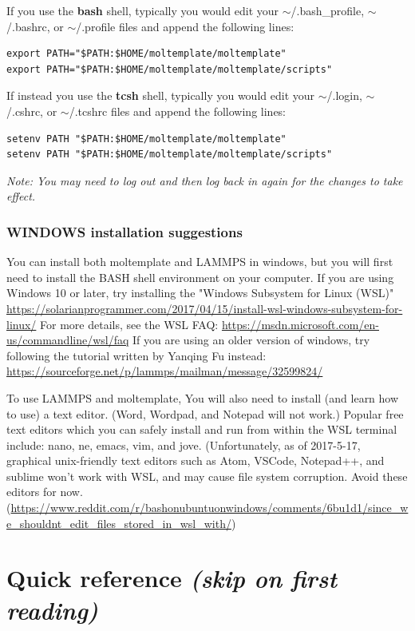 \documentclass[11pt]{article}
\begin{document}
If you use the \textbf{bash} shell, typically you would edit your 
\mbox{$\sim$/.bash\_profile}, 
\mbox{$\sim$/.bashrc}, or 
\mbox{$\sim$/.profile} files
and append the following lines:
\begin{verbatim}
export PATH="$PATH:$HOME/moltemplate/moltemplate"
export PATH="$PATH:$HOME/moltemplate/moltemplate/scripts"
\end{verbatim}
If instead you use the \textbf{tcsh} shell, typically you would edit your 
\mbox{$\sim$/.login}, 
\mbox{$\sim$/.cshrc}, or 
\mbox{$\sim$/.tcshrc} files 
and append the following lines:
\begin{verbatim}
setenv PATH "$PATH:$HOME/moltemplate/moltemplate"
setenv PATH "$PATH:$HOME/moltemplate/moltemplate/scripts"
\end{verbatim}



\textit{Note: You may need to log out and then 
log back in again for the changes to take effect.}


\subsubsection*{WINDOWS installation suggestions}

You can install both moltemplate and LAMMPS in windows, but you will first need to install the BASH shell environment on your computer.  If you are using Windows 10 or later, try installing the "Windows Subsystem for Linux (WSL)"
\url{https://solarianprogrammer.com/2017/04/15/install-wsl-windows-subsystem-for-linux/}
For more details, see the WSL FAQ:
\url{https://msdn.microsoft.com/en-us/commandline/wsl/faq}
If you are using an older version of windows, try following the tutorial written by Yanqing Fu instead:
\url{https://sourceforge.net/p/lammps/mailman/message/32599824/}

To use LAMMPS and moltemplate, You will also need to install (and learn how to use) a text editor.  (Word, Wordpad, and Notepad will not work.)  Popular free text editors which you can safely install and run from within the WSL terminal include: nano, ne, emacs, vim, and jove.  (Unfortunately, as of 2017-5-17, graphical unix-friendly text editors such as Atom, VSCode, Notepad++, and sublime won't work with WSL, and may cause file system corruption.  Avoid these editors for now. (\url{https://www.reddit.com/r/bashonubuntuonwindows/comments/6bu1d1/since_we_shouldnt_edit_files_stored_in_wsl_with/})


\pagebreak
\section{Quick reference \textit{(skip on first reading)}}
\end{document}
